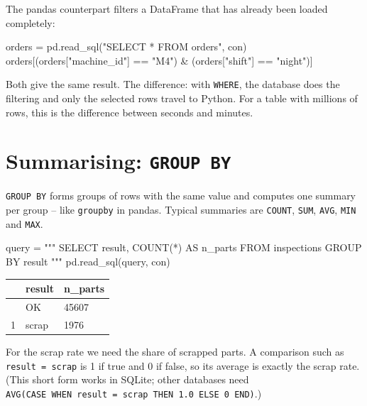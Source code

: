 \documentclass[
  letterpaper,
  DIV=11,
  numbers=noendperiod]{scrreprt}
\newenvironment{Shaded}{\begin{snugshade}}{\end{snugshade}}
\newcommand{\NormalTok}[1]{\textcolor[rgb]{0.00,0.23,0.31}{#1}}
\newcommand{\OperatorTok}[1]{\textcolor[rgb]{0.37,0.37,0.37}{#1}}
\newcommand{\StringTok}[1]{\textcolor[rgb]{0.13,0.47,0.30}{#1}}
\begin{document}
The pandas counterpart filters a DataFrame that has already been loaded
completely:

\begin{Shaded}
\begin{Highlighting}[]
\NormalTok{orders }\OperatorTok{=}\NormalTok{ pd.read\_sql(}\StringTok{"SELECT * FROM orders"}\NormalTok{, con)}
\NormalTok{orders[(orders[}\StringTok{"machine\_id"}\NormalTok{] }\OperatorTok{==} \StringTok{"M4"}\NormalTok{) }\OperatorTok{\&}\NormalTok{ (orders[}\StringTok{"shift"}\NormalTok{] }\OperatorTok{==} \StringTok{"night"}\NormalTok{)]}
\end{Highlighting}
\end{Shaded}

Both give the same result. The difference: with \texttt{WHERE}, the
database does the filtering and only the selected rows travel to Python.
For a table with millions of rows, this is the difference between
seconds and minutes.

\section{\texorpdfstring{Summarising:
\texttt{GROUP\ BY}}{Summarising: GROUP BY}}\label{summarising-group-by}

\texttt{GROUP\ BY} forms groups of rows with the same value and computes
one summary per group -- like \texttt{groupby} in pandas. Typical
summaries are \texttt{COUNT}, \texttt{SUM}, \texttt{AVG}, \texttt{MIN}
and \texttt{MAX}.

\begin{Shaded}
\begin{Highlighting}[]
\NormalTok{query }\OperatorTok{=} \StringTok{"""}
\StringTok{SELECT result, COUNT(*) AS n\_parts}
\StringTok{FROM inspections}
\StringTok{GROUP BY result}
\StringTok{"""}
\NormalTok{pd.read\_sql(query, con)}
\end{Highlighting}
\end{Shaded}

\begin{longtable}[]{@{}lll@{}}
\toprule\noalign{}
& result & n\_parts \\
\midrule\noalign{}
\endhead
\bottomrule\noalign{}
\endlastfoot
0 & OK & 45607 \\
1 & scrap & 1976 \\
\end{longtable}

For the scrap rate we need the share of scrapped parts. A comparison
such as \texttt{result\ =\ \textquotesingle{}scrap\textquotesingle{}} is
1 if true and 0 if false, so its average is exactly the scrap rate.
(This short form works in SQLite; other databases need
\texttt{AVG(CASE\ WHEN\ result\ =\ \textquotesingle{}scrap\textquotesingle{}\ THEN\ 1.0\ ELSE\ 0\ END)}.)
\end{document}
